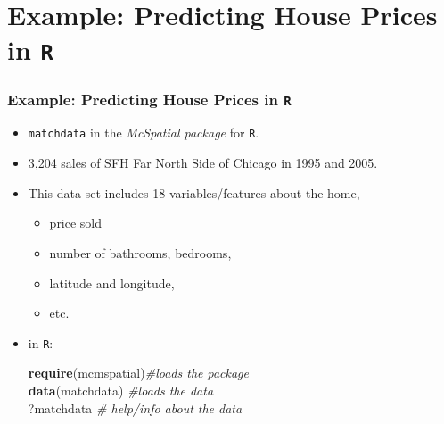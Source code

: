 \documentclass[
  shownotes,
  xcolor={svgnames},
  hyperref={colorlinks,citecolor=DarkBlue,linkcolor=DarkRed,urlcolor=DarkBlue}
  ]{beamer}
\newenvironment{Shaded}{\begin{snugshade}}{\end{snugshade}}
\newcommand{\CommentTok}[1]{\textcolor[rgb]{0.56,0.35,0.01}{\textit{#1}}}
\newcommand{\KeywordTok}[1]{\textcolor[rgb]{0.13,0.29,0.53}{\textbf{#1}}}
\newcommand{\NormalTok}[1]{#1}
\begin{document}
\section{Example: Predicting House Prices in \texttt{R}}
\begin{frame}[fragile]
\frametitle{Example: Predicting House Prices in \texttt{R}}



    \begin{minipage}[t]{0.48\linewidth}

    \begin{itemize}
      \footnotesize
    \item  \texttt{matchdata}  in the
\emph{McSpatial package} for \texttt{R}. 
  \item  3,204 sales of SFH Far North Side of Chicago in 1995 and 2005. 
  \item This data set includes 18 variables/features about the home, 
  \begin{itemize}
    \tiny
    \item price sold
    \item number of bathrooms, bedrooms, 
    \item latitude and longitude,
    \item etc. 
  \end{itemize}
  \item  in \texttt{R}:
  \medskip
  
      \begin{Shaded}
      
        \footnotesize
        \KeywordTok{require}\NormalTok{(mcmspatial)}\CommentTok{\tiny \#loads the package}    \\

          \KeywordTok{data}\NormalTok{(matchdata) }\CommentTok{\tiny \#loads the data}    \\

          \NormalTok{?matchdata }\CommentTok{\tiny \# help/info about  the data}    \\
      

\end{Shaded}
\end{itemize}
\end{minipage}
\end{frame}
\end{document}

